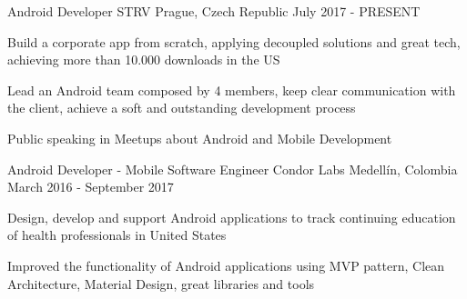 

\begin{cventries}

  \cventry
    {Android Developer}
    {STRV}
    {Prague, Czech Republic}
    {July 2017 - PRESENT}
    {
      \begin{cvitems}
        \item {Build a corporate app from scratch, applying decoupled solutions and great tech, achieving more than 10.000 downloads in the US}
        \item {Lead an Android team composed by 4 members, keep clear communication with the client, achieve a soft and outstanding
               development process}
        \item {Public speaking in Meetups about Android and Mobile Development}
      \end{cvitems}
      \begin{cvsubentries}
      \end{cvsubentries}
    }
  \cventry
    {Android Developer - Mobile Software Engineer}
    {Condor Labs}
    {Medellín, Colombia}
    {March 2016 - September 2017}
    {
      \begin{cvitems}
        \item {Design, develop and support Android applications to track continuing education of
               health professionals in United States}
        \item {Improved the functionality of Android applications using MVP pattern, Clean
               Architecture, Material Design, great libraries and tools}
      \end{cvitems}
      \begin{cvsubentries}
\end{cvsubentries}}
\end{cventries}
